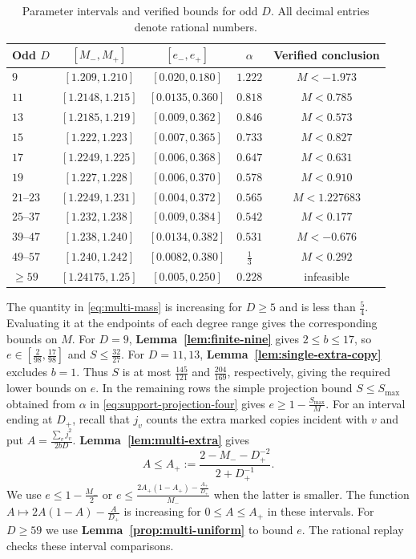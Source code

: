 \documentclass[preprint,11pt,numbers]{elsarticle-arxiv}
\numberwithin{equation}{section}
\theoremstyle{definition}
\begin{document}
\begin{table}[t]
\centering
\small
\begin{tabular}{@{}lcccc@{}}
\toprule
Odd $D$ & $[M_-,M_+]$ & $[e_-,e_+]$ & $\alpha$ & Verified conclusion\\
\midrule
$9$        & $[1.209,1.210]$  & $[0.020,0.180]$   & $1.222$ & $M<-1.973$\\
$11$       & $[1.2148,1.215]$ & $[0.0135,0.360]$  & $0.818$ & $M<0.785$\\
$13$       & $[1.2185,1.219]$ & $[0.009,0.362]$   & $0.846$ & $M<0.573$\\
$15$       & $[1.222,1.223]$  & $[0.007,0.365]$   & $0.733$ & $M<0.827$\\
$17$       & $[1.2249,1.225]$ & $[0.006,0.368]$   & $0.647$ & $M<0.631$\\
$19$       & $[1.227,1.228]$  & $[0.006,0.370]$   & $0.578$ & $M<0.910$\\
$21$--$23$ & $[1.2249,1.231]$ & $[0.004,0.372]$   & $0.565$ & $M<1.227683$\\
$25$--$37$ & $[1.232,1.238]$  & $[0.009,0.384]$   & $0.542$ & $M<0.177$\\
$39$--$47$ & $[1.238,1.240]$  & $[0.0134,0.382]$  & $0.531$ & $M<-0.676$\\
$49$--$57$ & $[1.240,1.242]$  & $[0.0082,0.380]$  & $\frac{1}{3}$ & $M<0.292$\\
$\ge59$    & $[1.24175,1.25]$ & $[0.005,0.250]$   & $0.228$ & infeasible\\
\bottomrule
\end{tabular}
\caption{Parameter intervals and verified bounds for odd $D$. All decimal entries denote rational numbers.}
\label{tab:multi-odd}
\end{table}

The quantity in \eqref{eq:multi-mass} is increasing for $D\ge5$ and is
less than $\frac{5}{4}$. Evaluating it at the endpoints of each degree
range gives the corresponding bounds on $M$.
For $D=9$, \textbf{Lemma~\ref{lem:finite-nine}} gives $2\le b\le17$, so
$e\in[\frac{2}{98},\frac{17}{98}]$ and $S\le\frac{32}{27}$. For $D=11,13$,
\textbf{Lemma~\ref{lem:single-extra-copy}} excludes $b=1$. Thus $S$ is at most
$\frac{145}{121}$ and $\frac{204}{169}$, respectively, giving the required lower
bounds on $e$. In the remaining rows the simple projection bound
$S\le S_{\max}$ obtained from $\alpha$
in \eqref{eq:support-projection-four} gives $e\ge1-\frac{S_{\max}}{M}$. For an
interval ending at $D_+$, recall that $j_v$ counts the extra marked
copies incident with $v$ and put $A=\frac{\sum_v j_v^2}{2bD}$.
\textbf{Lemma~\ref{lem:multi-extra}} gives
\[
 A\le A_+:=\frac{2-M_--D_+^{-2}}{2+D_+^{-1}}.
\]
We use $e\le1-\frac{M_-}{2}$ or
$e\le\frac{2A_+(1-A_+)-\frac{A_+}{D_+}}{M_-}$ when the latter is smaller.
The function $A\mapsto 2A(1-A)-\frac{A}{D_+}$ is increasing for
$0\le A\le A_+$ in these intervals.
For $D\ge59$ we use \textbf{Lemma~\ref{prop:multi-uniform}} to bound $e$.
The rational replay checks these interval comparisons.
\end{document}

